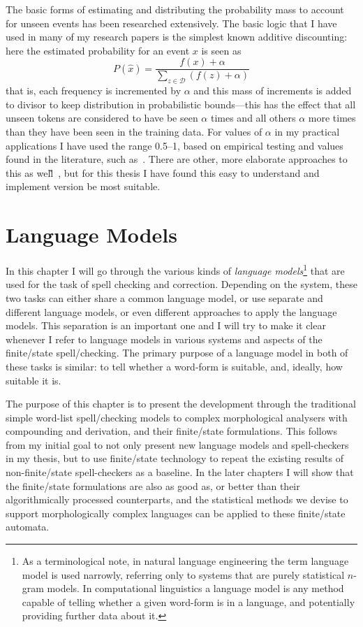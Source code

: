 \documentclass[officiallayout]{unihelcompling}
\begin{document}
The basic forms of estimating and distributing the probability mass to account
for unseen events has been researched extensively. The basic logic that I have
used in many of my research papers is the simplest known additive discounting:
here the estimated probability for an event $x$ is seen as 
\begin{equation}
    P(\hat{x}) = \frac{f(x) + \alpha}{\sum_{z \in \mathcal{D}}(f(z) + \alpha)}
\end{equation}
that is, each frequency is incremented by $\alpha$ and this mass of increments
is added to divisor to keep distribution in probabilistic bounds---this has the
effect that all unseen tokens are considered to have be seen $\alpha$ times and
all others $\alpha$ more times than they have been seen in the training data.
For values of $\alpha$ in my practical applications I have used the range
0.5--1, based on empirical testing and values found in the literature, such
as~\citet{manning1999foundations}. There are other, more elaborate approaches
to this as well̃~\cite{chen1999empirical}, but for this thesis I have found this
easy to understand and implement version be most suitable.



\chapter{Language Models}
\label{chap:language-models}

In this chapter I will go through the various kinds of
\emph{language models}\footnote{As a terminological note, in natural language
    engineering the term language model is used narrowly, referring only
    to systems that are purely statistical \(n\)-gram models. In
    computational linguistics a language model is any method capable of
    telling whether a given word-form is in a language, and potentially
    providing further data about it.} that are
used for the task of spell checking and correction.  Depending on the system,
these two tasks can either share a common language model, or use separate and
different language models, or even different approaches to apply the language
models. This separation is an important one and I will try to make it clear
whenever I refer to language models in various systems and aspects of the
finite\-/state spell\-/checking.  The primary purpose of a language model in
both of these tasks is similar: to tell whether a word-form is suitable, and,
ideally, how suitable it is.

The purpose of this chapter is to present the development through the
traditional simple word-list spell\-/checking models to complex morphological
analysers with compounding and derivation, and their finite\-/state formulations.
This follows from my initial goal to not only present new language models and
spell-checkers in my thesis, but to use finite\-/state technology to repeat the
existing results of non-finite\-/state spell-checkers as a baseline. In the later
chapters I will show that the finite\-/state formulations are also as good as, or
better than their algorithmically processed counterparts, and the statistical
methods we devise to support morphologically complex languages can be applied
to these finite\-/state automata.
\end{document}

